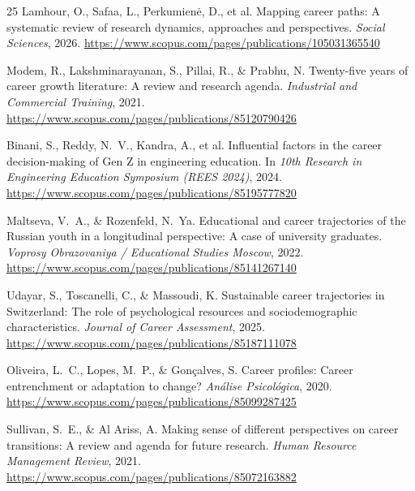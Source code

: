 \documentclass[10pt,twocolumn]{article}
\begin{document}
\begin{thebibliography}{25}
Lamhour, O., Safaa, L., Perkumienė, D., et al.
\newblock Mapping career paths: A systematic review of research dynamics,
approaches and perspectives.
\newblock \emph{Social Sciences}, 2026.
\newblock \url{https://www.scopus.com/pages/publications/105031365540}

Modem, R., Lakshminarayanan, S., Pillai, R., \& Prabhu, N.
\newblock Twenty-five years of career growth literature: A review and research
agenda.
\newblock \emph{Industrial and Commercial Training}, 2021.
\newblock \url{https://www.scopus.com/pages/publications/85120790426}

Binani, S., Reddy, N.\ V., Kandra, A., et al.
\newblock Influential factors in the career decision-making of Gen Z in
engineering education.
\newblock In \emph{10th Research in Engineering Education Symposium
(REES 2024)}, 2024.
\newblock \url{https://www.scopus.com/pages/publications/85195777820}

Maltseva, V.\ A., \& Rozenfeld, N.\ Ya.
\newblock Educational and career trajectories of the Russian youth in a
longitudinal perspective: A case of university graduates.
\newblock \emph{Voprosy Obrazovaniya / Educational Studies Moscow}, 2022.
\newblock \url{https://www.scopus.com/pages/publications/85141267140}

Udayar, S., Toscanelli, C., \& Massoudi, K.
\newblock Sustainable career trajectories in Switzerland: The role of
psychological resources and sociodemographic characteristics.
\newblock \emph{Journal of Career Assessment}, 2025.
\newblock \url{https://www.scopus.com/pages/publications/85187111078}

Oliveira, L.\ C., Lopes, M.\ P., \& Gonçalves, S.
\newblock Career profiles: Career entrenchment or adaptation to change?
\newblock \emph{Análise Psicológica}, 2020.
\newblock \url{https://www.scopus.com/pages/publications/85099287425}

Sullivan, S.\ E., \& Al Ariss, A.
\newblock Making sense of different perspectives on career transitions: A review
and agenda for future research.
\newblock \emph{Human Resource Management Review}, 2021.
\newblock \url{https://www.scopus.com/pages/publications/85072163882}


\end{thebibliography}
\end{document}
